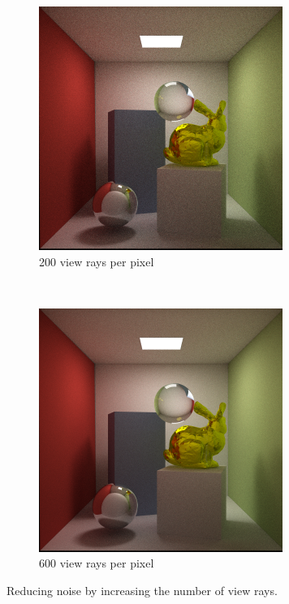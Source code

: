 \documentclass[]{report}   %
\begin{document}
\begin{figure}
	\begin{subfigure}[b]{0.5\textwidth}
                \includegraphics[width=\textwidth]{figures/specular_200rpp-.png}
                \caption{200 view rays per pixel}
                \label{fig:200rpp}
        \end{subfigure}%
	~
	\begin{subfigure}[b]{0.5\textwidth}
                \includegraphics[width=\textwidth]{figures/specular_600rpp-.png}
                \caption{600 view rays per pixel}
                \label{fig:600rpp}
        \end{subfigure}
        \caption{Reducing noise by increasing the number of view rays.}\label{fig:vew_rays}
\end{figure}
\end{document}
